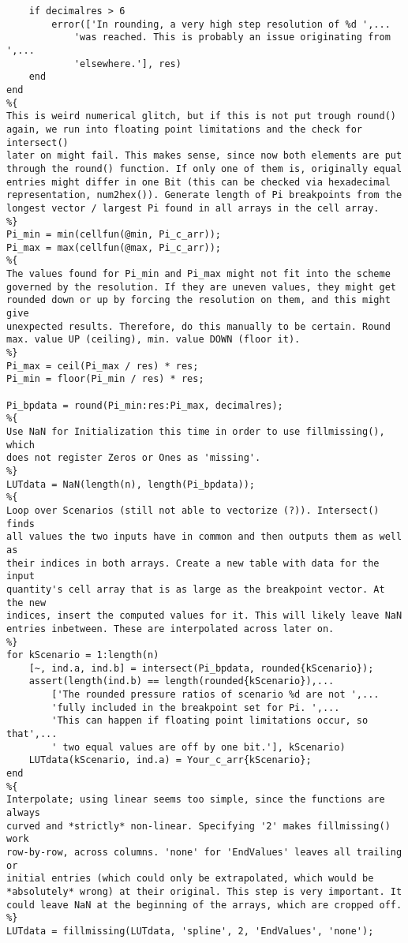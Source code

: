 \begin{lstlisting}
    if decimalres > 6
        error(['In rounding, a very high step resolution of %d ',...
            'was reached. This is probably an issue originating from ',...
            'elsewhere.'], res)
    end
end
%{
This is weird numerical glitch, but if this is not put trough round()
again, we run into floating point limitations and the check for intersect()
later on might fail. This makes sense, since now both elements are put
through the round() function. If only one of them is, originally equal
entries might differ in one Bit (this can be checked via hexadecimal
representation, num2hex()). Generate length of Pi breakpoints from the
longest vector / largest Pi found in all arrays in the cell array.
%}
Pi_min = min(cellfun(@min, Pi_c_arr));
Pi_max = max(cellfun(@max, Pi_c_arr));
%{
The values found for Pi_min and Pi_max might not fit into the scheme
governed by the resolution. If they are uneven values, they might get
rounded down or up by forcing the resolution on them, and this might give
unexpected results. Therefore, do this manually to be certain. Round
max. value UP (ceiling), min. value DOWN (floor it).
%}
Pi_max = ceil(Pi_max / res) * res;
Pi_min = floor(Pi_min / res) * res;

Pi_bpdata = round(Pi_min:res:Pi_max, decimalres);
%{
Use NaN for Initialization this time in order to use fillmissing(), which
does not register Zeros or Ones as 'missing'.
%}
LUTdata = NaN(length(n), length(Pi_bpdata));
%{
Loop over Scenarios (still not able to vectorize (?)). Intersect() finds
all values the two inputs have in common and then outputs them as well as
their indices in both arrays. Create a new table with data for the input
quantity's cell array that is as large as the breakpoint vector. At the new
indices, insert the computed values for it. This will likely leave NaN
entries inbetween. These are interpolated across later on.
%}
for kScenario = 1:length(n)
    [~, ind.a, ind.b] = intersect(Pi_bpdata, rounded{kScenario});
    assert(length(ind.b) == length(rounded{kScenario}),...
        ['The rounded pressure ratios of scenario %d are not ',...
        'fully included in the breakpoint set for Pi. ',...
        'This can happen if floating point limitations occur, so that',...
        ' two equal values are off by one bit.'], kScenario)
    LUTdata(kScenario, ind.a) = Your_c_arr{kScenario};
end
%{
Interpolate; using linear seems too simple, since the functions are always
curved and *strictly* non-linear. Specifying '2' makes fillmissing() work
row-by-row, across columns. 'none' for 'EndValues' leaves all trailing or
initial entries (which could only be extrapolated, which would be
*absolutely* wrong) at their original. This step is very important. It
could leave NaN at the beginning of the arrays, which are cropped off.
%}
LUTdata = fillmissing(LUTdata, 'spline', 2, 'EndValues', 'none');


\end{lstlisting}
